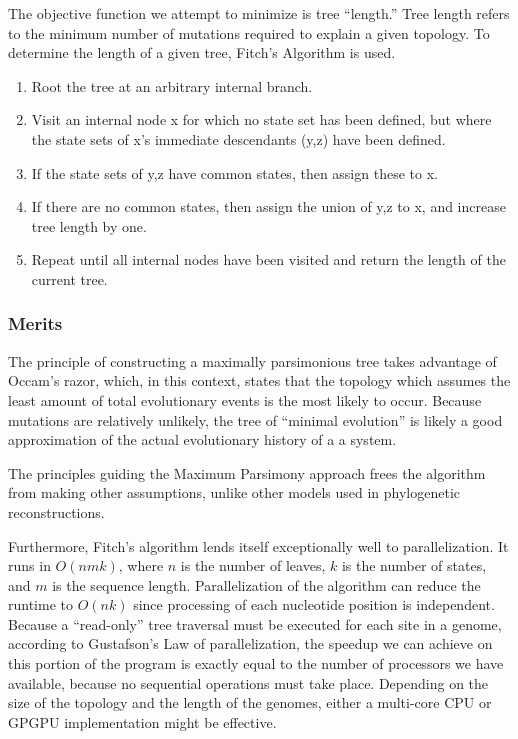 \documentclass[10pt,twocolumn]{article}
\begin{document}
The objective function we attempt to minimize is tree ``length.'' Tree length refers to the
minimum number of mutations required to explain a given topology.
To determine the length of a given tree, Fitch's Algorithm \cite{fitch1967construction} is used.
\begin{enumerate}
\item Root the tree at an arbitrary internal branch.
\item Visit an internal node x for which no state set has been defined, but where the state sets of x's immediate descendants (y,z) have been defined.
\item If the state sets of y,z have common states, then assign these to x.
\item If there are no common states, then assign the union of y,z to x, and increase tree length by one.
\item Repeat until all internal nodes have been visited and return the length of the current tree.
\end{enumerate}

\subsubsection*{Merits}
The principle of constructing a maximally parsimonious tree takes advantage of Occam's razor, which, in this context, states that the topology which assumes the least amount of total evolutionary events is the most likely to occur. Because mutations are relatively unlikely, the tree of ``minimal evolution'' is likely a good approximation of the actual evolutionary history of a a system.

The principles guiding the Maximum Parsimony approach frees the algorithm from making other assumptions, unlike other models used in phylogenetic reconstructions.

Furthermore, Fitch's algorithm lends itself exceptionally well to parallelization. It runs in $O(nmk)$, where $n$ is the number of leaves, $k$ is the number of states, and $m$ is the sequence length. Parallelization of the algorithm can reduce the runtime to $O(nk)$ since processing of each nucleotide position is independent. Because a ``read-only'' tree traversal must be executed for each site in a genome, according to Gustafson's Law of parallelization, the speedup we can achieve on this portion of the program is exactly equal to the number of processors we have available, because no sequential operations must take place. Depending on the size of the topology and the length of the genomes, either a multi-core CPU or GPGPU implementation might be effective.
\end{document}
